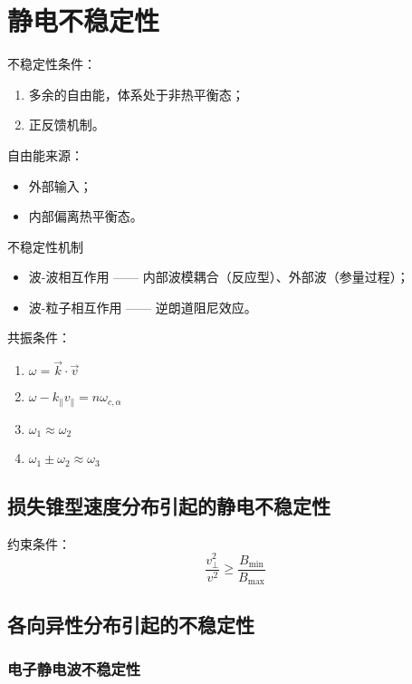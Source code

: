 
\chapter{静电不稳定性}

不稳定性条件：
\begin{enumerate}
    \item 多余的自由能，体系处于非热平衡态；
    \item 正反馈机制。
\end{enumerate}

自由能来源：
\begin{itemize}
    \item 外部输入；
    \item 内部偏离热平衡态。
\end{itemize}

不稳定性机制
\begin{itemize}
    \item 波-波相互作用 —— 内部波模耦合（反应型）、外部波（参量过程）；
    \item 波-粒子相互作用 —— 逆朗道阻尼效应。
\end{itemize}

共振条件：
\begin{enumerate}
    \item $\omega = \vec{k}\cdot\vec{v}$
    \item $\omega - k_\parallel v_\parallel = n \omega_{c,\alpha}$
    \item $\omega_1 \approx \omega_2$
    \item $\omega_1 \pm \omega_2 \approx \omega_3$
\end{enumerate}

\section{损失锥型速度分布引起的静电不稳定性}

约束条件：
\begin{equation}
\frac{v_\perp^2}{v^2} \geq \frac{B_{\min}}{B_{\max}}
\end{equation}

\section{各向异性分布引起的不稳定性}

\subsection{电子静电波不稳定性}

